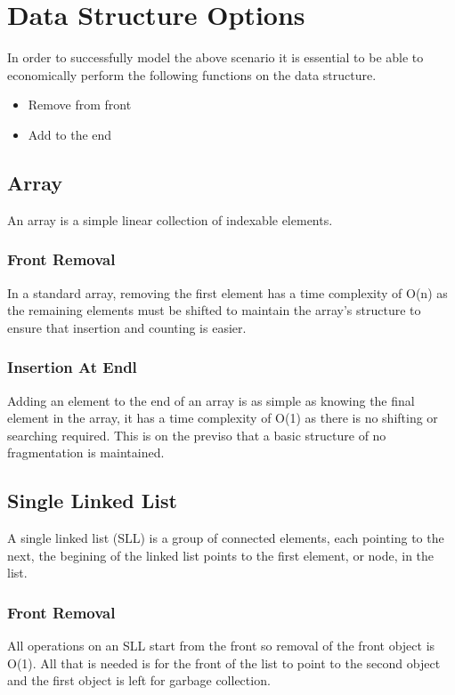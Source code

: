 \documentclass[pdftex,a4paper,10pt,titlepage]{article}
\begin{document}
\noindent{\rule{\textwidth}{0.4pt}}

\section{Data Structure Options}

In order to successfully model the above scenario it is essential to be able to economically perform the following functions on the data structure.
\begin{itemize}
\item Remove from front
\item Add to the end
\end{itemize}


\subsection{Array}

An array is a simple linear collection of indexable elements. 

\subsubsection{Front Removal}
In a standard array, removing the first element has a time complexity of O(n) as the remaining elements must be shifted to maintain the array’s structure to ensure that insertion and counting is easier.

\subsubsection{Insertion At Endl}
Adding an element to the end of an array is as simple as knowing the final element in the array, it has a time complexity of O(1) as there is no shifting or searching required. This is on the previso that a basic structure of no fragmentation is maintained.

\subsection{Single Linked List}

A single linked list (SLL) is a group of connected elements, each pointing to the next, the begining of the linked list points to the first element, or node, in the list.

\subsubsection{Front Removal}
All operations on an SLL start from the front so removal of the front object is O(1). All that is needed is for the front of the list to point to the second object and the first object is left for garbage collection.
\end{document}
